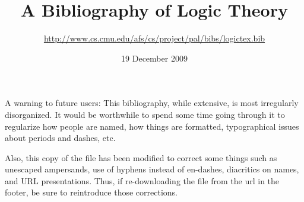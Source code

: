 \documentclass[12pt]{article}
\author{\url{http://www.cs.cmu.edu/afs/cs/project/pal/bibs/logictex.bib}}
\title{A Bibliography of Logic Theory}
\date{19 December 2009}
\begin{document}
A warning to future users: This bibliography, while extensive, is most irregularly disorganized. It would be worthwhile to spend some time going through it to regularize how people are named, how things are formatted, typographical issues about periods and dashes, etc.

Also, this copy of the \BibTeX file has been modified to correct some things such as unescaped ampersands, use of hyphens instead of en-dashes, diacritics on names, and URL presentations. Thus, if re-downloading the file from the url in the footer, be sure to reintroduce those corrections.

\raggedright%
\nocite{*}

\end{document}
